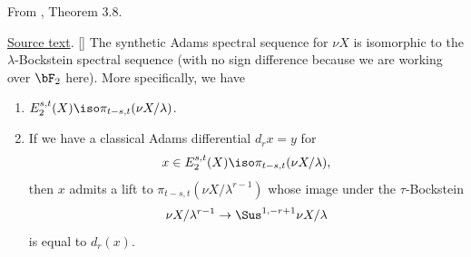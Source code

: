 \begin{theorem}
\label{paper:3.8}
From \cite{LWX126}, Theorem 3.8.\par

\href{paper/main.tex.html#L813}{Source text}.
[{\cite[Theorem A.1]{BHS}}]\label{thm:17e90ac0}
    The synthetic Adams spectral sequence for $\nu X$ is isomorphic to the $\lambda$-Bockstein spectral sequence (with no sign difference because we are working over $\bF_2$ here). More specifically, we have
    \begin{enumerate}
        \item $E_2^{s,t}(X)\iso \pi_{t-s,t}(\nu X /\lambda)$.
        \item If we have a classical Adams differential $d_rx=y$ for 
        $$x\in E_2^{s,t}(X)\iso \pi_{t-s,t}(\nu X /\lambda),$$
        then $x$ admits a lift to $\pi_{t-s,t}(\nu X/\lambda^{r-1})$ whose image under the $\tau$-Bockstein
        $$\nu X/\lambda^{r-1}\to \Sus^{1,-r+1}\nu X/\lambda$$
        is equal to $d_r(x)$.
    \end{enumerate}




\end{theorem}
